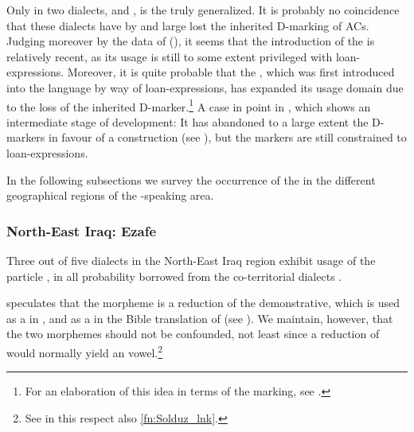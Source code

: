 Only in two dialects, \Rus and \JSan, is the \ez* truly generalized. It is probably no coincidence that these dialects have by and large lost the inherited D-marking of ACs. Judging moreover by the data of \JSan (), it seems that the introduction of the \ez* is relatively recent, as its usage is still to some extent privileged with loan-expressions. Moreover, it is quite probable that the \ez*, which was first introduced into the language by way of loan-expressions, has expanded its usage domain due to the loss of the inherited D-marker.\footnote{For an elaboration of this idea in terms of  the \cst* marking, see \citet{GutmanForgetting}.} A case in point in \JSul, which shows an intermediate stage of development: It has abandoned to a large extent the D-markers in favour of a  construction (see ), but the \ez* markers are still constrained to loan-expressions.

In the following subsections we survey the occurrence of the \ez* in the different geographical regions of the -speaking area. 

\subsubsection{North-East Iraq:  Ezafe} \label{ss:i_ezafe}

Three out of five dialects in the North-East Iraq region exhibit usage of the \ez* particle , in all probability borrowed from the co-territorial \Sor dialects \citep[cf.][408]{KhanRustaqa}.

\citet[169]{KhanArbel} speculates that the  morpheme is a reduction of the  demonstrative, which is used as a \lnk* in \JUrm, and as a \rel* in the Bible translation of \Ruw (see ). We maintain, however, that the two morphemes should not be confounded, not least since a reduction of  would normally yield an  vowel.\footnote{See in this respect also \vref{fn:Solduz_lnk}.} 

